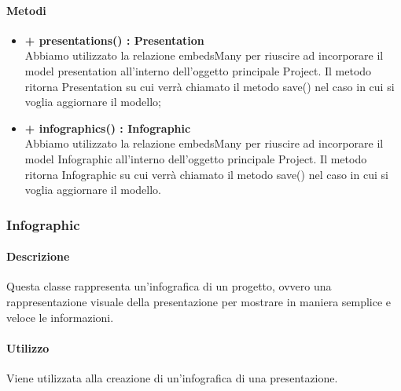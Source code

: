 	\paragraph{Metodi}
	\begin{itemize}
		\item \textbf{+ presentations() : Presentation}\\
		Abbiamo utilizzato la relazione embedsMany per riuscire ad incorporare il model presentation all'interno dell'oggetto principale Project. Il metodo ritorna Presentation su cui verrà chiamato il metodo save() nel caso in cui si voglia aggiornare il modello;
		\item \textbf{+ infographics() : Infographic}\\
		Abbiamo utilizzato la relazione embedsMany per riuscire ad incorporare il model Infographic all’interno dell’oggetto principale Project. Il metodo ritorna Infographic su cui verrà chiamato il metodo save() nel caso in cui si voglia aggiornare il modello.
	\end{itemize}

\subsubsection{Infographic}


	\paragraph{Descrizione}
	Questa classe rappresenta un’infografica di un progetto, ovvero una rappresentazione visuale della presentazione per mostrare in maniera semplice e veloce le informazioni.
	
	\paragraph{Utilizzo}
	Viene utilizzata alla creazione di un’infografica di una presentazione.

